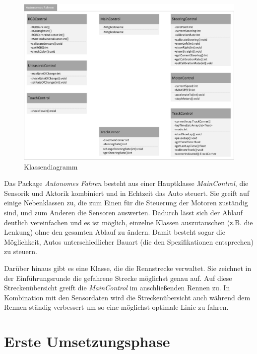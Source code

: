 \documentclass[a4paper,12pt]{article}                                         %
\numberwithin{table}{section}                               %
\numberwithin{figure}{section}                              %
\begin{document}
	\begin{figure}[h]
				\includegraphics[scale=0.7]{../Bilder/Klassendiagramm.png}
				\caption{Klassendiagramm}
			\end{figure}
	Das Package\textit{ Autonomes Fahren} besteht aus einer Hauptklasse \textit{MainControl}, die Sensorik und Aktorik kombiniert und in Echtzeit das Auto steuert. Sie greift auf einige Nebenklassen zu, die zum Einen für die Steuerung der Motoren zuständig sind, und zum Anderen die Sensoren auswerten. Dadurch lässt sich der Ablauf deutlich vereinfachen und es ist möglich, einzelne Klassen auszutauschen (z.B. die Lenkung) ohne den gesamten Ablauf zu ändern. Damit besteht sogar die Möglichkeit, Autos unterschiedlicher Bauart (die den Spezifikationen entsprechen) zu steuern. 
	
	\bigskip
	Darüber hinaus gibt es eine Klasse, die die Rennstrecke verwaltet. Sie zeichnet in der Einführungsrunde die gefahrene Strecke möglichst genau auf. Auf diese Streckenübersicht greift die \textit{MainControl} im anschließenden Rennen zu. In Kombination mit den Sensordaten wird die Streckenübersicht auch während dem Rennen ständig verbessert um so eine möglichst optimale Linie zu fahren.
	
	\newpage
	
	\section{Erste Umsetzungsphase}
\end{document}
